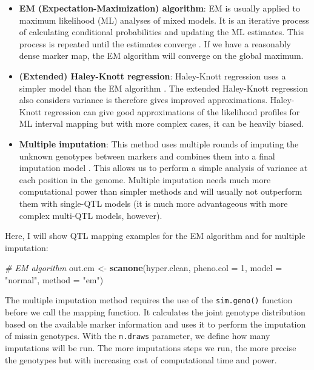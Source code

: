 \documentclass[12pt,]{krantz}
\newenvironment{Shaded}{\begin{snugshade}}{\end{snugshade}}
\newcommand{\KeywordTok}[1]{\textcolor[rgb]{0.27,0.27,0.27}{\textbf{#1}}}
\newcommand{\DataTypeTok}[1]{\textcolor[rgb]{0.27,0.27,0.27}{#1}}
\newcommand{\DecValTok}[1]{\textcolor[rgb]{0.06,0.06,0.06}{#1}}
\newcommand{\StringTok}[1]{\textcolor[rgb]{0.5,0.5,0.5}{#1}}
\newcommand{\CommentTok}[1]{\textcolor[rgb]{0.56,0.35,0.01}{\textit{#1}}}
\newcommand{\NormalTok}[1]{#1}
\providecommand{\tightlist}{%
  \setlength{\itemsep}{0pt}\setlength{\parskip}{0pt}}
\theoremstyle{definition}
\theoremstyle{definition}
\theoremstyle{definition}
\theoremstyle{remark}
\begin{document}
\begin{itemize}
\tightlist
\item
  \textbf{EM (Expectation-Maximization) algorithm}: EM is usually
  applied to maximum likelihood (ML) analyses of mixed models. It is an
  iterative process of calculating conditional probabilities and
  updating the ML estimates. This process is repeated until the
  estimates converge \citep{Lander185}. If we have a reasonably dense
  marker map, the EM algorithm will converge on the global maximum.
\item
  \textbf{(Extended) Haley-Knott regression}: Haley-Knott regression
  uses a simpler model than the EM algorithm \citep{Haley1992}. The
  extended Haley-Knott regression also considers variance is therefore
  gives improved approximations. Haley-Knott regression can give good
  approximations of the likelihood profiles for ML interval mapping but
  with more complex cases, it can be heavily biased.
\item
  \textbf{Multiple imputation}: This method uses multiple rounds of
  imputing the unknown genotypes between markers and combines them into
  a final imputation model \citep{Sen371}. This allows us to perform a
  simple analysis of variance at each position in the genome. Multiple
  imputation needs much more computational power than simpler methods
  and will usually not outperform them with single-QTL models (it is
  much more advantageous with more complex multi-QTL models, however).
\end{itemize}

Here, I will show QTL mapping examples for the EM algorithm and for
multiple imputation:

\begin{Shaded}
\begin{Highlighting}[]
\CommentTok{# EM algorithm}
\NormalTok{out.em <-}\StringTok{ }\KeywordTok{scanone}\NormalTok{(hyper.clean, }\DataTypeTok{pheno.col =} \DecValTok{1}\NormalTok{, }\DataTypeTok{model =} \StringTok{"normal"}\NormalTok{, }
                  \DataTypeTok{method =} \StringTok{"em"}\NormalTok{)}
\end{Highlighting}
\end{Shaded}

The multiple imputation method requires the use of the
\texttt{sim.geno()} function before we call the mapping function. It
calculates the joint genotype distribution based on the available marker
information and uses it to perform the imputation of missin genotypes.
With the \texttt{n.draws} parameter, we define how many imputations will
be run. The more imputations steps we run, the more precise the
genotypes but with increasing cost of computational time and power.
\end{document}
